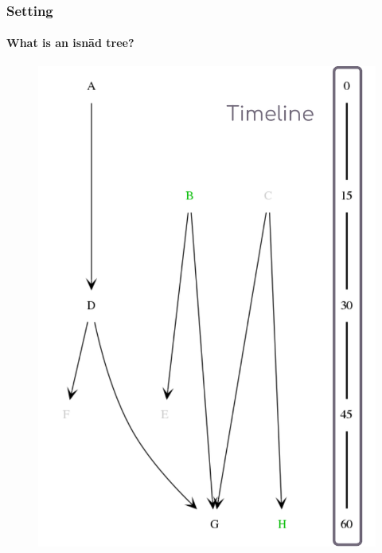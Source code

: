 \documentclass[9pt]{beamer}
\begin{document}
\begin{frame}
\frametitle{Setting}
\framesubtitle{What is an isnād tree?}
\begin{figure}
\includegraphics[width=.5\linewidth]{figures/isnalyser_parts_3.pdf}
\end{figure}
\end{frame} 
\end{document}
